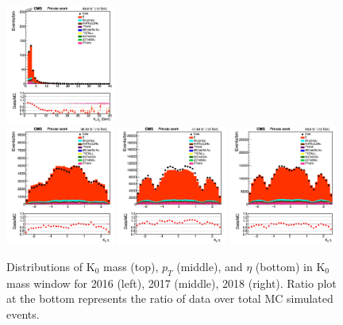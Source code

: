 \documentclass{cernatlasnote}
\begin{document}
\begin{figure}[htp]
 \includegraphics[width=0.32\textwidth]{images/emu_channel/2018/18_Range_0pt7_1pt3/Reco_K0_pt_M_wind_Linear.png}\\
 \includegraphics[width=0.32\textwidth]{images/emu_channel/2016/16_Range_0pt7_1pt3/Reco_K0_eta_M_wind_Linear.png}
\includegraphics[width=0.32\textwidth]{images/emu_channel/2017/17_Range_0pt7_1pt3/Reco_K0_eta_M_wind_Linear.png}
 \includegraphics[width=0.32\textwidth]{images/emu_channel/2018/18_Range_0pt7_1pt3/Reco_K0_eta_M_wind_Linear.png}\\
 \caption{Distributions of K$_{0}$ mass (top), $p_{T}$ (middle), and $\eta$ (bottom) in K$_{0}$ mass window for 2016 (left), 2017 (middle), 2018 (right). Ratio plot at the bottom represents the ratio of data over total MC simulated events.}
 \label{fig:K0DATAMC}
  \end{figure}
\end{document}
